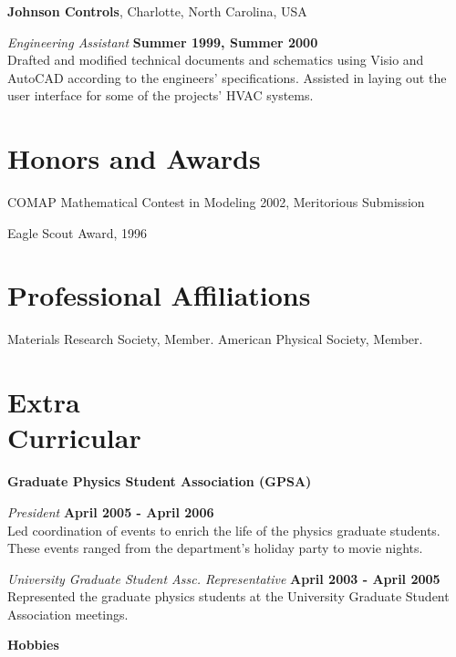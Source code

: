 \documentclass[letterpaper,margin,line]{res}
\begin{document}
\begin{resume}

{\bf Johnson Controls}, Charlotte, North Carolina, USA

\vspace{-.3cm}
{\em Engineering Assistant} \hfill {\bf Summer 1999, Summer 2000}\\
Drafted and modified technical documents and schematics using Visio and AutoCAD according to the engineers' specifications. Assisted in laying out the user interface for some of the projects' HVAC systems.


\section{\sc Honors and Awards} 
COMAP Mathematical Contest in Modeling 2002, Meritorious Submission

\vspace*{-2.5mm}
Eagle Scout Award, 1996


\section{\sc Professional Affiliations} 
Materials Research Society, Member.
American Physical Society, Member.

\section{\sc Extra\\ Curricular}
{\bf Graduate Physics Student Association (GPSA)}

\vspace{-.3cm}
{\em President} \hfill {\bf April 2005 - April 2006} \\
Led coordination of events to enrich the life of the physics graduate students. These events ranged from the department's holiday party to movie nights.

\vspace{-.3cm}
{\em University Graduate Student Assc. Representative} \hfill {\bf April 2003 - April 2005}\\
Represented the graduate physics students at the University Graduate Student Association meetings.

{\bf Hobbies}


\end{resume}
\end{document}
